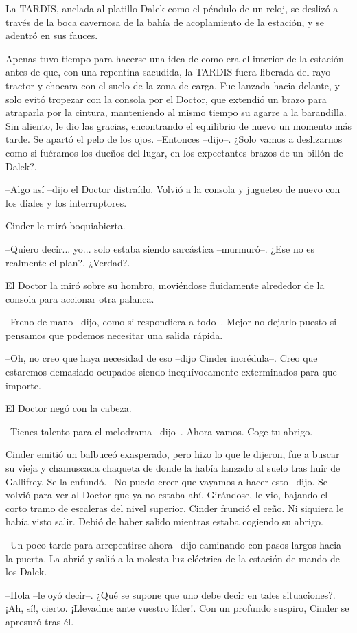 La TARDIS, anclada al platillo Dalek como el péndulo de un reloj, se deslizó a través de la boca cavernosa de la bahía de acoplamiento de la estación, y se adentró en sus fauces.

Apenas tuvo tiempo para hacerse una idea de como era el interior de la estación antes de que, con una repentina sacudida, la TARDIS fuera liberada del rayo tractor y chocara con el suelo de la zona de carga. Fue lanzada hacia delante, y solo evitó tropezar con la consola por el Doctor, que extendió un brazo para atraparla por la cintura, manteniendo al mismo tiempo su agarre a la barandilla. Sin aliento, le dio las gracias, encontrando el equilibrio de nuevo un momento más tarde. Se apartó el pelo de los ojos.
--Entonces --dijo--. ¿Solo vamos a deslizarnos como si fuéramos los dueños del lugar, en los expectantes brazos de un billón de Dalek?.

--Algo así --dijo el Doctor distraído. Volvió a la consola y jugueteo de nuevo con los diales y los interruptores.

Cinder le miró boquiabierta. 

--Quiero decir... yo... solo estaba siendo sarcástica --murmuró--. ¿Ese no es realmente el plan?. ¿Verdad?.

El Doctor la miró sobre su hombro, moviéndose fluidamente alrededor de la consola para accionar otra palanca. 

--Freno de mano --dijo, como si respondiera a todo--. Mejor no dejarlo puesto si pensamos que podemos necesitar una salida rápida.

--Oh, no creo que haya necesidad de eso --dijo Cinder incrédula--. Creo que estaremos demasiado ocupados siendo inequívocamente exterminados para que importe.

El Doctor negó con la cabeza. 

--Tienes talento para el melodrama --dijo--. Ahora vamos. Coge tu abrigo.

Cinder emitió un balbuceó exasperado, pero hizo lo que le dijeron, fue a buscar su vieja y chamuscada chaqueta de donde la había lanzado al suelo tras huir de Gallifrey. Se la enfundó. --No puedo creer que vayamos a hacer esto --dijo. Se volvió para ver al Doctor que ya no estaba ahí. Girándose, le vio, bajando el corto tramo de escaleras del nivel superior. Cinder frunció el ceño. Ni siquiera le había visto salir. Debió de haber salido mientras estaba cogiendo su abrigo.

--Un poco tarde para arrepentirse ahora --dijo caminando con pasos largos hacia la puerta. La abrió y salió a la molesta luz eléctrica de la estación de mando de los Dalek.

--Hola --le oyó decir--. ¿Qué se supone que uno debe decir en tales situaciones?. ¡Ah, sí!, cierto. ¡Llevadme ante vuestro líder!.
Con un profundo suspiro, Cinder se apresuró tras él.